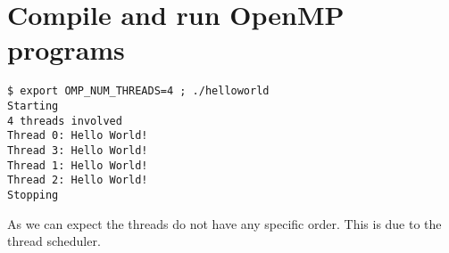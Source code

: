 \chapter{Compile and run OpenMP programs}

\begin{verbatim}
$ export OMP_NUM_THREADS=4 ; ./helloworld
Starting
4 threads involved
Thread 0: Hello World!
Thread 3: Hello World!
Thread 1: Hello World!
Thread 2: Hello World!
Stopping
\end{verbatim}

As we can expect the threads do not have any specific order. This is due to the thread scheduler.

